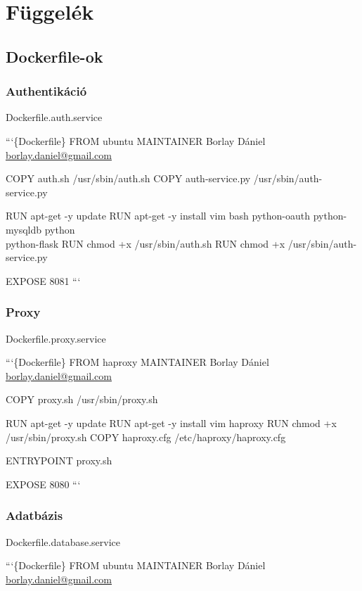 \appendix

\chapter{Függelék}\label{fuxfcggeluxe9k}

\section{Dockerfile-ok}\label{dockerfile-ok}

\subsection{Authentikáció}\label{authentikuxe1ciuxf3}

Dockerfile.auth.service

```\{Dockerfile\} FROM ubuntu MAINTAINER Borlay Dániel
\href{mailto:borlay.daniel@gmail.com}{borlay.daniel@gmail.com}

COPY auth.sh /usr/sbin/auth.sh COPY auth-service.py
/usr/sbin/auth-service.py

RUN apt-get -y update RUN apt-get -y install vim bash python-oauth
python-mysqldb python\\ python-flask RUN chmod +x /usr/sbin/auth.sh RUN
chmod +x /usr/sbin/auth-service.py

EXPOSE 8081 ```

\subsection{Proxy}\label{proxy}

Dockerfile.proxy.service

```\{Dockerfile\} FROM haproxy MAINTAINER Borlay Dániel
\href{mailto:borlay.daniel@gmail.com}{borlay.daniel@gmail.com}

COPY proxy.sh /usr/sbin/proxy.sh

RUN apt-get -y update RUN apt-get -y install vim haproxy RUN chmod +x
/usr/sbin/proxy.sh COPY haproxy.cfg /etc/haproxy/haproxy.cfg

ENTRYPOINT proxy.sh

EXPOSE 8080 ```

\subsection{Adatbázis}\label{adatbuxe1zis}

Dockerfile.database.service

```\{Dockerfile\} FROM ubuntu MAINTAINER Borlay Dániel
\href{mailto:borlay.daniel@gmail.com}{borlay.daniel@gmail.com}

